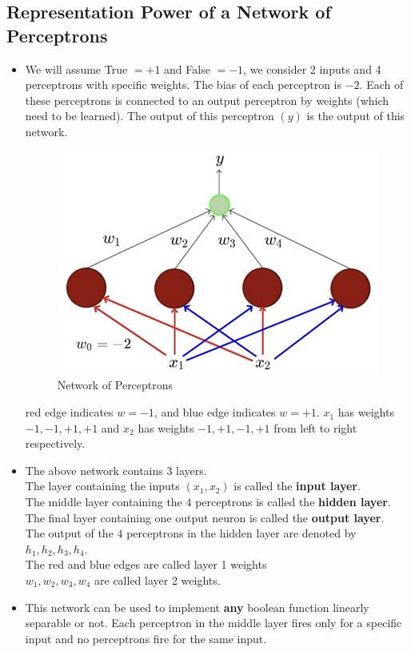 \documentclass[a4paper]{article}
\begin{document}
\subsection{Representation Power of a Network of Perceptrons}
\begin{itemize}
    \item We will assume True $=+1$ and False $=-1$, we consider 2 inputs and 4 perceptrons with specific weights. The bias of each perceptron is $-2$. Each of these perceptrons is connected to an output perceptron by weights (which need to be learned). The output of this perceptron $(y)$ is the output of this network.
    \begin{figure}[H]
        \centering
        \includegraphics[width=0.5\linewidth]{Degree//static/DL_simple_network.png}
        \caption{Network of Perceptrons}
        \label{fig:DL-simple-network}
    \end{figure}
    red edge indicates $w=-1$, and blue edge indicates $w=+1$. $x_1$ has weights $-1,-1,+1,+1$ and $x_2$ has weights $-1, +1, -1, +1$ from left to right respectively.
    \item The above network contains $3$ layers.\\
    The layer containing the inputs $(x_1,x_2)$ is called the \textbf{input layer}.\\
    The middle layer containing the $4$ perceptrons is called the \textbf{hidden layer}.\\
    The final layer containing one output neuron is called the \textbf{output layer}.\\
    The output of the $4$ perceptrons in the hidden layer are denoted by $h_1,h_2,h_3,h_4$.\\
    The red and blue edges are called layer 1 weights\\
    $w_1,w_2,w_3,w_4$ are called layer 2 weights.
    \item This network can be used to implement \textbf{any} boolean function linearly separable or not. Each perceptron in the middle layer fires only for a specific input and no perceptrons fire for the same input.

\end{itemize}
\end{document}
